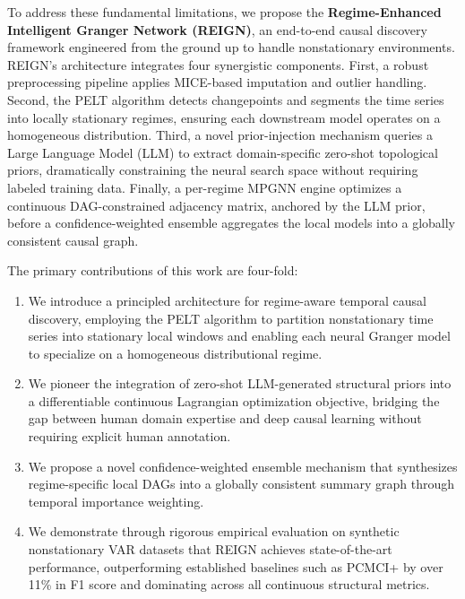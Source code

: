 To address these fundamental limitations, we propose the \textbf{Regime-Enhanced Intelligent Granger Network (REIGN)}, an end-to-end causal discovery framework engineered from the ground up to handle nonstationary environments. REIGN's architecture integrates four synergistic components. First, a robust preprocessing pipeline applies MICE-based imputation and outlier handling. Second, the PELT algorithm detects changepoints and segments the time series into locally stationary regimes, ensuring each downstream model operates on a homogeneous distribution. Third, a novel prior-injection mechanism queries a Large Language Model (LLM) to extract domain-specific zero-shot topological priors, dramatically constraining the neural search space without requiring labeled training data. Finally, a per-regime MPGNN engine optimizes a continuous DAG-constrained adjacency matrix, anchored by the LLM prior, before a confidence-weighted ensemble aggregates the local models into a globally consistent causal graph.

The primary contributions of this work are four-fold:
\begin{enumerate}
    \item We introduce a principled architecture for regime-aware temporal causal discovery, employing the PELT algorithm to partition nonstationary time series into stationary local windows and enabling each neural Granger model to specialize on a homogeneous distributional regime.
    \item We pioneer the integration of zero-shot LLM-generated structural priors into a differentiable continuous Lagrangian optimization objective, bridging the gap between human domain expertise and deep causal learning without requiring explicit human annotation.
    \item We propose a novel confidence-weighted ensemble mechanism that synthesizes regime-specific local DAGs into a globally consistent summary graph through temporal importance weighting.
    \item We demonstrate through rigorous empirical evaluation on synthetic nonstationary VAR datasets that REIGN achieves state-of-the-art performance, outperforming established baselines such as PCMCI+ by over 11\% in F1 score and dominating across all continuous structural metrics.
\end{enumerate}
